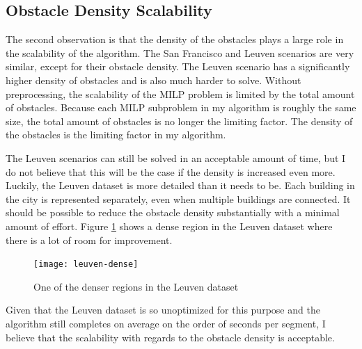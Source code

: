 \subsection{Obstacle Density Scalability}
The second observation is that the density of the obstacles plays a large role in the scalability of the algorithm. The San Francisco and Leuven scenarios are very similar, except for their obstacle density. The Leuven scenario has a significantly higher density of obstacles and is also much harder to solve. Without preprocessing, the scalability of the MILP problem is limited by the total amount of obstacles. Because each MILP subproblem in my algorithm is roughly the same size, the total amount of obstacles is no longer the limiting factor. The density of the obstacles is the limiting factor in my algorithm.
\par
The Leuven scenarios can still be solved in an acceptable amount of time, but I do not believe that this will be the case if the density is increased even more. Luckily, the Leuven dataset is more detailed than it needs to be. Each building in the city is represented separately, even when multiple buildings are connected. It should be possible to reduce the obstacle density substantially with a minimal amount of effort. Figure \ref{fig:leuven-dense} shows a dense region in the Leuven dataset where there is a lot of room for improvement.

\begin{figure}[h]
	\centering
	\texttt{[image: leuven-dense]}
	\caption{One of the denser regions in the Leuven dataset}
	\label{fig:leuven-dense}
\end{figure}

Given that the Leuven dataset is so unoptimized for this purpose and the algorithm still completes on average on the order of seconds per segment, I believe that the scalability with regards to the obstacle density is acceptable.


